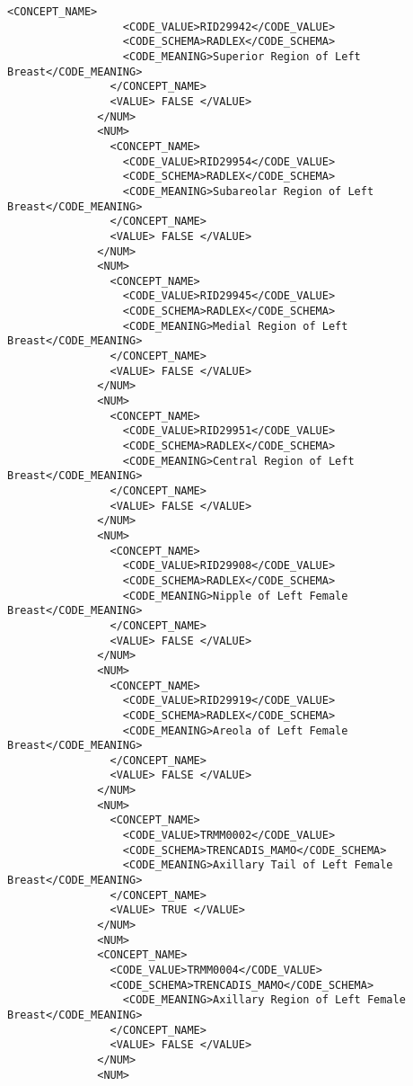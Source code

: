 \begin{lstlisting}[label=dicom-report,caption=Informe estructurado de una exploración de mama]
                <CONCEPT_NAME>
                  <CODE_VALUE>RID29942</CODE_VALUE>
                  <CODE_SCHEMA>RADLEX</CODE_SCHEMA>
                  <CODE_MEANING>Superior Region of Left Breast</CODE_MEANING>
                </CONCEPT_NAME>
                <VALUE> FALSE </VALUE>
              </NUM>
              <NUM>
                <CONCEPT_NAME>
                  <CODE_VALUE>RID29954</CODE_VALUE>
                  <CODE_SCHEMA>RADLEX</CODE_SCHEMA>
                  <CODE_MEANING>Subareolar Region of Left Breast</CODE_MEANING>
                </CONCEPT_NAME>
                <VALUE> FALSE </VALUE>
              </NUM>
              <NUM>
                <CONCEPT_NAME>
                  <CODE_VALUE>RID29945</CODE_VALUE>
                  <CODE_SCHEMA>RADLEX</CODE_SCHEMA>
                  <CODE_MEANING>Medial Region of Left Breast</CODE_MEANING>
                </CONCEPT_NAME>
                <VALUE> FALSE </VALUE>
              </NUM>
              <NUM>
                <CONCEPT_NAME>
                  <CODE_VALUE>RID29951</CODE_VALUE>
                  <CODE_SCHEMA>RADLEX</CODE_SCHEMA>
                  <CODE_MEANING>Central Region of Left Breast</CODE_MEANING>
                </CONCEPT_NAME>
                <VALUE> FALSE </VALUE>
              </NUM>
              <NUM>
                <CONCEPT_NAME>
                  <CODE_VALUE>RID29908</CODE_VALUE>
                  <CODE_SCHEMA>RADLEX</CODE_SCHEMA>
                  <CODE_MEANING>Nipple of Left Female Breast</CODE_MEANING>
                </CONCEPT_NAME>
                <VALUE> FALSE </VALUE>
              </NUM>
              <NUM>
                <CONCEPT_NAME>
                  <CODE_VALUE>RID29919</CODE_VALUE>
                  <CODE_SCHEMA>RADLEX</CODE_SCHEMA>
                  <CODE_MEANING>Areola of Left Female Breast</CODE_MEANING>
                </CONCEPT_NAME>
                <VALUE> FALSE </VALUE>
              </NUM>
              <NUM>
                <CONCEPT_NAME>
                  <CODE_VALUE>TRMM0002</CODE_VALUE>
                  <CODE_SCHEMA>TRENCADIS_MAMO</CODE_SCHEMA>
                  <CODE_MEANING>Axillary Tail of Left Female Breast</CODE_MEANING>
                </CONCEPT_NAME>
                <VALUE> TRUE </VALUE>
              </NUM>
              <NUM>
              <CONCEPT_NAME>
                <CODE_VALUE>TRMM0004</CODE_VALUE>
                <CODE_SCHEMA>TRENCADIS_MAMO</CODE_SCHEMA>
                  <CODE_MEANING>Axillary Region of Left Female Breast</CODE_MEANING>
                </CONCEPT_NAME>
                <VALUE> FALSE </VALUE>
              </NUM>
              <NUM>

\end{lstlisting}
